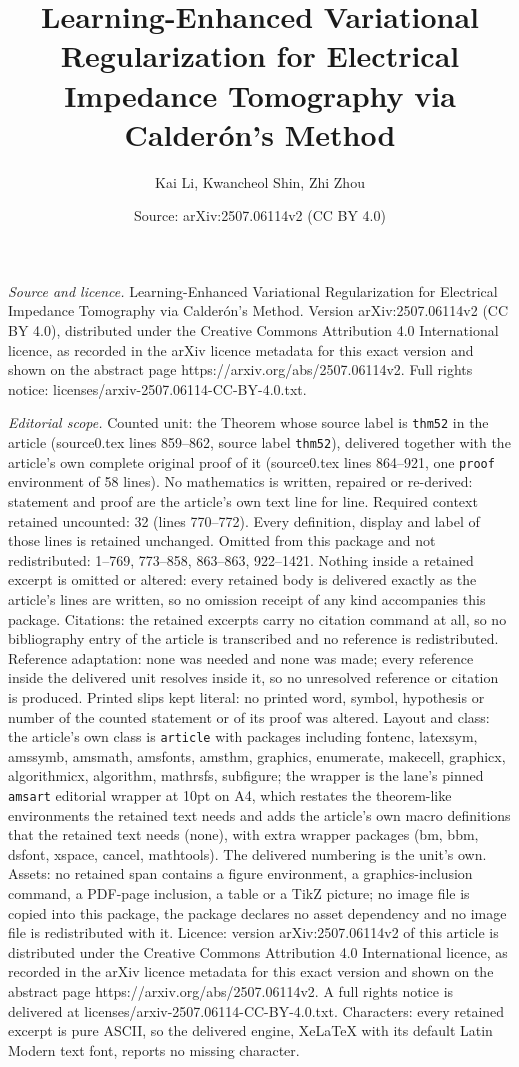 \documentclass[10pt,a4paper]{amsart}
\title[Learning-Enhanced Variational Regularization for Electrical ]{Learning-Enhanced Variational Regularization for Electrical Impedance Tomography via Calder\'on's Method}
\author{Kai Li, Kwancheol Shin, Zhi Zhou}
\date{Source: arXiv:2507.06114v2 (CC BY 4.0)}
\begin{document}
\maketitle

\noindent\emph{Source and licence.} Learning-Enhanced Variational Regularization for Electrical Impedance Tomography via Calder\'on's Method. Version arXiv:2507.06114v2 (CC BY 4.0), distributed under the Creative Commons Attribution 4.0 International licence, as recorded in the arXiv licence metadata for this exact version and shown on the abstract page https://arxiv.org/abs/2507.06114v2. Full rights notice: licenses/arxiv-2507.06114-CC-BY-4.0.txt.\par\smallskip

\noindent\textit{Editorial scope.} Counted unit: the Theorem whose source label is \texttt{thm52} in the article (source0.tex lines 859--862, source label \texttt{thm52}), delivered together with the article's own complete original proof of it (source0.tex lines 864--921, one \texttt{proof} environment of 58 lines). No mathematics is written, repaired or re-derived: statement and proof are the article's own text line for line. Required context retained uncounted: 32 (lines 770--772). Every definition, display and label of those lines is retained unchanged. Omitted from this package and not redistributed: 1--769, 773--858, 863--863, 922--1421. Nothing inside a retained excerpt is omitted or altered: every retained body is delivered exactly as the article's lines are written, so no omission receipt of any kind accompanies this package. Citations: the retained excerpts carry no citation command at all, so no bibliography entry of the article is transcribed and no reference is redistributed. Reference adaptation: none was needed and none was made; every reference inside the delivered unit resolves inside it, so no unresolved reference or citation is produced. Printed slips kept literal: no printed word, symbol, hypothesis or number of the counted statement or of its proof was altered. Layout and class: the article's own class is \texttt{article} with packages including fontenc, latexsym, amssymb, amsmath, amsfonts, amsthm, graphics, enumerate, makecell, graphicx, algorithmicx, algorithm, mathrsfs, subfigure; the wrapper is the lane's pinned \texttt{amsart} editorial wrapper at 10pt on A4, which restates the theorem-like environments the retained text needs and adds the article's own macro definitions that the retained text needs (none), with extra wrapper packages (bm, bbm, dsfont, xspace, cancel, mathtools). The delivered numbering is the unit's own. Assets: no retained span contains a figure environment, a graphics-inclusion command, a PDF-page inclusion, a table or a TikZ picture; no image file is copied into this package, the package declares no asset dependency and no image file is redistributed with it. Licence: version arXiv:2507.06114v2 of this article is distributed under the Creative Commons Attribution 4.0 International licence, as recorded in the arXiv licence metadata for this exact version and shown on the abstract page https://arxiv.org/abs/2507.06114v2. A full rights notice is delivered at licenses/arxiv-2507.06114-CC-BY-4.0.txt. Characters: every retained excerpt is pure ASCII, so the delivered engine, XeLaTeX with its default Latin Modern text font, reports no missing character.
\end{document}
